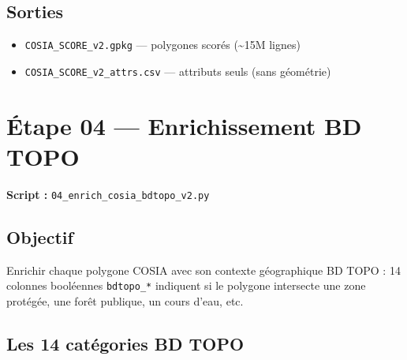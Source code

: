 \documentclass[12pt,a4paper]{report}
\newcommand{\code}[1]{\texttt{\small #1}}
\newcommand{\bdtopo}{\textsc{BD TOPO}}
\begin{document}
\subsection{Sorties}

\begin{itemize}
  \item \code{COSIA\_SCORE\_v2.gpkg} — polygones scorés (\textasciitilde{}15M lignes)
  \item \code{COSIA\_SCORE\_v2\_attrs.csv} — attributs seuls (sans géométrie)
\end{itemize}

\section{Étape 04 — Enrichissement BD TOPO}

\textbf{Script :} \code{04\_enrich\_cosia\_bdtopo\_v2.py}

\subsection{Objectif}

Enrichir chaque polygone COSIA avec son contexte géographique \bdtopo{} : 14 colonnes booléennes \code{bdtopo\_*} indiquent si le polygone intersecte une zone protégée, une forêt publique, un cours d'eau, etc.

\subsection{Les 14 catégories BD TOPO}
\end{document}
